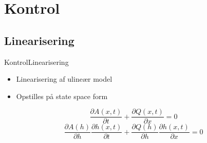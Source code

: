 \section{Kontrol}
\subsection{Linearisering}
\begin{frame}{Kontrol}{Linearisering}
 \vfill\vfill\centering    
\begin{itemize}
	\item Linearisering af ulineær model \vspace{5mm}
	\item Opstilles på state space form   \vspace{5mm}

\end{itemize}
\begin{equation*}\label{eq:linearization_Continuity}
\frac{\partial A(x,t)}{\partial t} + \frac{\partial Q(x,t)}{\partial x}=0
\end{equation*}\vspace{5mm}
\begin{equation*}
	\frac{\partial A(h)}{\partial h}\frac{\partial h(x,t)}{\partial t} + \frac{\partial Q(h)}{\partial h}\frac{\partial h(x,t)}{\partial x}=0
\end{equation*}
\vfill\vfill
\end{frame}

